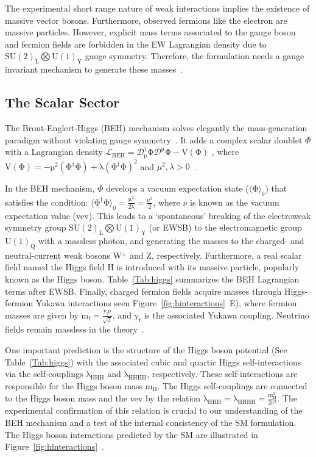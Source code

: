 The experimental short range nature of weak interactions implies the existence of massive vector bosons. Furthermore, observed fermions like the electron are massive particles. However, explicit mass terms associated to the gauge boson and fermion fields are forbidden in the EW Lagrangian density due to $\mathrm{SU(2)_{L}\bigotimes U(1)_{Y} }$ gauge symmetry. Therefore, the formulation needs a gauge invariant mechanism to generate these masses~\cite{costa,pdg}.

\subsection{The Scalar Sector}
The Brout-Englert-Higgs (BEH) mechanism solves elegantly the mass-generation paradigm without violating gauge symmetry~\cite{Higgs:1964ia,Englert:1964et,Guralnik:1964eu}. It adds a complex scalar doublet $\Phi$ with a Lagrangian density $\mathrm{\mathcal{L}_{BEH}=\mathcal{D}_{\mu}^{\dagger}\Phi \mathcal{D}^{\mu}\Phi-V(\Phi)}$ , where $\mathrm{V(\Phi) = - \mu^{2} (\Phi^{\dagger}\Phi ) + \lambda (\Phi^{\dagger}\Phi )^{2}  }$ and $\mu^{2},\lambda>0$~\cite{costa,pdg}.

In the BEH mechanism, $\Phi$ develops a vacuum expectation state ($\mathrm{\langle\Phi\rangle_{0}}$) that satisfies the condition: \hbox{$\mathrm{\langle\Phi^{\dagger}\Phi\rangle_{0} = \frac{\mu^{2}} {2\lambda} = \frac{\nu^{2}}{2}}$}, where $\nu$ is known as the vacuum expectation value (vev). This leads to a `spontaneous' breaking of the electroweak symmetry group $\mathrm{SU(2)_{L}\bigotimes U(1)_{Y}}$ (or EWSB) to the electromagnetic group $\mathrm{U(1)_{Q}}$ with a massless photon, and generating the masses to the charged- and neutral-current weak bosons W$^{\pm}$ and Z, respectively. Furthermore, a real scalar field named the Higgs field H is introduced with its massive particle, popularly known as the Higgs boson. Table~\ref{Tab:higgs} summarizes the BEH Lagrangian terms after EWSB. Finally, charged fermion fields acquire masses through Higgs-fermion Yukawa interactions seen Figure~\ref{fig:hinteractions}~E), where fermion masses are given by $\mathrm{m_{f}=\frac{y_{f}\nu}{\sqrt{2}}}$, and $\mathrm{y_{f}}$ is the associated Yukawa coupling. Neutrino fields remain massless in the theory~\cite{costa,pdg}.

One important prediction is the structure of the Higgs boson potential (See Table~\ref{Tab:higgs}) with the associated cubic and quartic Higgs self-interactions via the self-couplings $\mathrm{\lambda_{HHH}}$ and $\mathrm{\lambda_{HHHH}}$, respectively. These self-interactions are responsible for the Higgs boson mass $\mathrm{m_{H}}$. The Higgs self-couplings are connected to the Higgs boson mass and the vev by the relation $\mathrm{\lambda_{HHH} =\lambda_{HHHH} = \frac{m_{H}^{2}} { 2 {\nu}^{2}}}$. The experimental confirmation of this relation is crucial to our understanding of the BEH mechanism and a test of the internal consistency of the SM formulation. The Higgs boson interactions predicted by the SM are illustrated in Figure~\ref{fig:hinteractions}~\cite{costa,pdg}.

